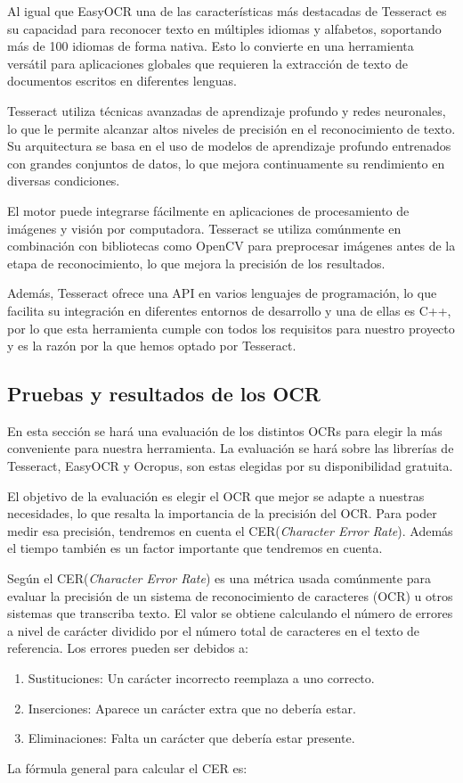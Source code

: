 \begin{enumerate}
	Al igual que EasyOCR una de las características más destacadas de Tesseract es su capacidad para reconocer texto en múltiples idiomas y alfabetos, soportando más de 100 idiomas de forma nativa. Esto lo convierte en una herramienta versátil para aplicaciones globales que requieren la extracción de texto de documentos escritos en diferentes lenguas.
	
	Tesseract utiliza técnicas avanzadas de aprendizaje profundo y redes neuronales, lo que le permite alcanzar altos niveles de precisión en el reconocimiento de texto. Su arquitectura se basa en el uso de modelos de aprendizaje profundo entrenados con grandes conjuntos de datos, lo que mejora continuamente su rendimiento en diversas condiciones.
	
	El motor puede integrarse fácilmente en aplicaciones de procesamiento de imágenes y visión por computadora. Tesseract se utiliza comúnmente en combinación con bibliotecas como OpenCV para preprocesar imágenes antes de la etapa de reconocimiento, lo que mejora la precisión de los resultados.
	
	Además, Tesseract ofrece una API en varios lenguajes de programación, lo que facilita su integración en diferentes entornos de desarrollo y una de ellas es C++, por lo que esta herramienta cumple con todos los requisitos para nuestro proyecto y es la razón por la que hemos optado por Tesseract.
\end{enumerate}
\subsection{Pruebas y resultados de los OCR}
En esta sección se hará una evaluación de los distintos OCRs para elegir la más conveniente para nuestra herramienta.
La evaluación se hará sobre las librerías de Tesseract, EasyOCR y Ocropus, son estas elegidas por su disponibilidad gratuita.

El objetivo de la evaluación es elegir el OCR que mejor se adapte a nuestras necesidades, lo que resalta la importancia de la precisión del OCR.
Para poder medir esa precisión, tendremos en cuenta el CER(\textit{Character Error Rate}). Además el tiempo también es un factor importante que tendremos en cuenta.

Según \cite{CER} el CER(\textit{Character Error Rate}) es una métrica usada comúnmente para evaluar la precisión de un sistema de reconocimiento de caracteres (OCR) u otros sistemas que transcriba texto. El valor se obtiene calculando el número de errores a nivel de carácter dividido por el número total de caracteres en el texto de referencia.
Los errores pueden ser debidos a:
\begin{enumerate}
	\item Sustituciones: Un carácter incorrecto reemplaza a uno correcto.
	\item Inserciones: Aparece un carácter extra que no debería estar.
	\item Eliminaciones: Falta un carácter que debería estar presente.
\end{enumerate}
La fórmula general para calcular el CER es:
	
